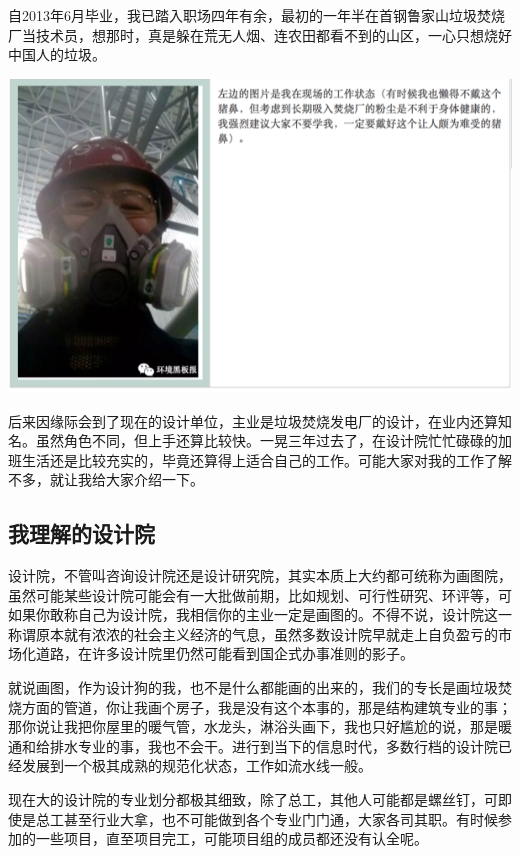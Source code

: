 \documentclass[]{book}
\begin{document}
自2013年6月毕业，我已踏入职场四年有余，最初的一年半在首钢鲁家山垃圾焚烧厂当技术员，想那时，真是躲在荒无人烟、连农田都看不到的山区，一心只想烧好中国人的垃圾。

\includegraphics[width=8.33in]{images/sisi1}

后来因缘际会到了现在的设计单位，主业是垃圾焚烧发电厂的设计，在业内还算知名。虽然角色不同，但上手还算比较快。一晃三年过去了，在设计院忙忙碌碌的加班生活还是比较充实的，毕竟还算得上适合自己的工作。可能大家对我的工作了解不多，就让我给大家介绍一下。

\subsection{我理解的设计院}

设计院，不管叫咨询设计院还是设计研究院，其实本质上大约都可统称为画图院，虽然可能某些设计院可能会有一大批做前期，比如规划、可行性研究、环评等，可如果你敢称自己为设计院，我相信你的主业一定是画图的。不得不说，设计院这一称谓原本就有浓浓的社会主义经济的气息，虽然多数设计院早就走上自负盈亏的市场化道路，在许多设计院里仍然可能看到国企式办事准则的影子。

就说画图，作为设计狗的我，也不是什么都能画的出来的，我们的专长是画垃圾焚烧方面的管道，你让我画个房子，我是没有这个本事的，那是结构建筑专业的事；那你说让我把你屋里的暖气管，水龙头，淋浴头画下，我也只好尴尬的说，那是暖通和给排水专业的事，我也不会干。进行到当下的信息时代，多数行档的设计院已经发展到一个极其成熟的规范化状态，工作如流水线一般。

现在大的设计院的专业划分都极其细致，除了总工，其他人可能都是螺丝钉，可即使是总工甚至行业大拿，也不可能做到各个专业门门通，大家各司其职。有时候参加的一些项目，直至项目完工，可能项目组的成员都还没有认全呢。
\end{document}
